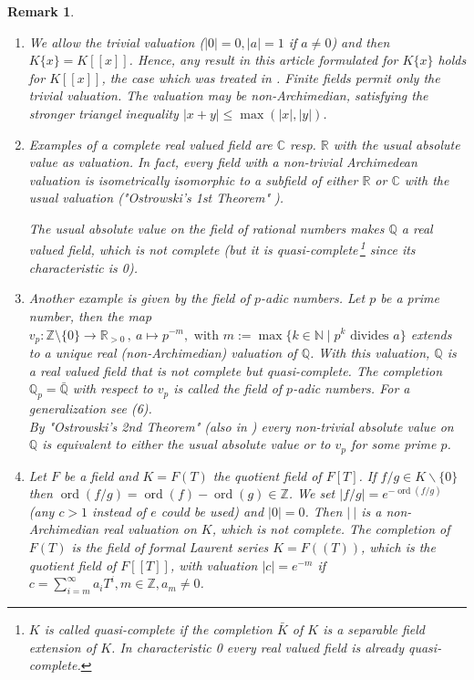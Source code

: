\documentclass[11pt]{article}
\DeclareMathOperator{\ord}{ord}
\newtheorem{Remark}[Definition]{Remark}
\newcommand{\N}{{\mathbb N}}
\newcommand{\Z}{{\mathbb Z}}
\newcommand{\R}{{\mathbb R}}
\newcommand{\C}{{\mathbb C}}
\newcommand{\Q}{{\mathbb Q}}
\begin{document}
 \begin{Remark}\label{rm.rvf}{\em
\begin{enumerate}
\item [(1)] We allow the trivial valuation  ($|0| =0, |a| =1$ if $a\ne 0$) and then $K\{x\}=K[[x]]$. Hence, any result in this article formulated for $K\{x\}$ holds for  $K[[x]]$, the case which was treated in \cite[Chapter 3.1]{GLS25}.
Finite fields permit only the trivial valuation. The valuation may be non-Archimedian, satisfying the stronger triangel inequality  $|x+y|\le \max(|x|,|y|)$.
\item  [(2)] Examples of a complete real valued field are $\C$  
resp. $\R$ with the usual absolute value as valuation.  {In fact, every field with a non-trivial Archimedean valuation is isometrically isomorphic to a subfield of either $\R$ or $\C$ with the usual valuation ("Ostrowski's 1st Theorem" \cite{Os16}).}

The usual absolute value on the field of rational numbers makes $\Q$ a real valued field, which is not complete (but it is quasi-complete\,\footnote{$K$ is called {\em quasi-complete} if the completion $\bar K$  of $K$ is a separable field extension of $K$. In characteristic 0 every real valued field is already quasi-complete.} since its characteristic is 0).
\item  [(3)] Another example is given by the field of $p$-adic numbers.
Let \mbox{$p$} be a prime number, then the map
$ v_p:\Z\setminus\{0\} \to \R_{>0}\,,\ a \mapsto p^{-m}, \text{ with }
m:=\max\{k\in \N  \mid p^k \text{ divides }a\} $
extends to a unique real  {(non-Archimedian)} valuation of $\Q$. With this
valuation, $\Q$ is a real valued field that is not complete but quasi-complete.
 The completion $\Q_p= \bar \Q$ with respect to  $v_p$ is called the
field of {\em $p$-adic numbers}.
 {For a generalization see (6).\\
By "Ostrowski’s 2nd Theorem" (also in \cite{Os16}) every non-trivial absolute value
on $\Q$ is equivalent to either the usual absolute value or to $v_p$ for some prime $p$.}
\item  [(4)]  Let $F$ be a field and $K=F(T)$ the quotient field of $F[T]$. If $ f/g \in K\smallsetminus \{0\}$ then
$\ord(f/g) = \ord(f)-\ord(g) \in \Z$.  {We set
$|f/g| = e^{-\ord(f/g)}$ (any $c>1$ instead of $e$ could be used) and $|0|=0$. Then $| \ |$ is a non-Archimedian real valuation on $K$, which is not complete.
The completion of $F(T)$ is  the field of {\em formal Laurent series} $K=F((T))$, which is the quotient field of $F[[T]]$, with valuation $|c| = e^{-m}$ if $c=\sum_{i=m}^\infty a_iT^i, m \in \Z, a_m\ne0$. }


\end{enumerate}}
\end{Remark}
\end{document}
